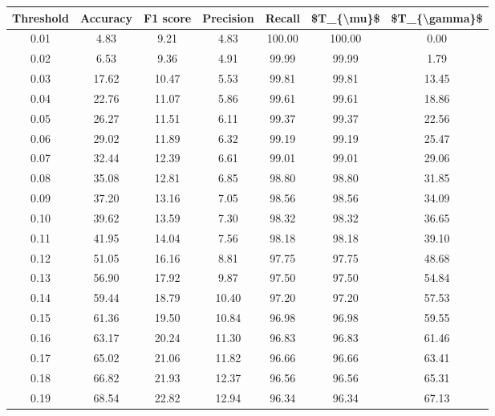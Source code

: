 \begin{tabular}{|c|c|c|c|c|c|c|}
\toprule
 Threshold &  Accuracy &  F1 score &  Precision &  Recall &  \$T\_\{\textbackslash mu\}\$ &  \$T\_\{\textbackslash gamma\}\$ \\
\hline
      0.01 &      4.83 &      9.21 &       4.83 &  100.00 &     100.00 &          0.00 \\
      0.02 &      6.53 &      9.36 &       4.91 &   99.99 &      99.99 &          1.79 \\
      0.03 &     17.62 &     10.47 &       5.53 &   99.81 &      99.81 &         13.45 \\
      0.04 &     22.76 &     11.07 &       5.86 &   99.61 &      99.61 &         18.86 \\
      0.05 &     26.27 &     11.51 &       6.11 &   99.37 &      99.37 &         22.56 \\
      0.06 &     29.02 &     11.89 &       6.32 &   99.19 &      99.19 &         25.47 \\
      0.07 &     32.44 &     12.39 &       6.61 &   99.01 &      99.01 &         29.06 \\
      0.08 &     35.08 &     12.81 &       6.85 &   98.80 &      98.80 &         31.85 \\
      0.09 &     37.20 &     13.16 &       7.05 &   98.56 &      98.56 &         34.09 \\
      0.10 &     39.62 &     13.59 &       7.30 &   98.32 &      98.32 &         36.65 \\
      0.11 &     41.95 &     14.04 &       7.56 &   98.18 &      98.18 &         39.10 \\
      0.12 &     51.05 &     16.16 &       8.81 &   97.75 &      97.75 &         48.68 \\
      0.13 &     56.90 &     17.92 &       9.87 &   97.50 &      97.50 &         54.84 \\
      0.14 &     59.44 &     18.79 &      10.40 &   97.20 &      97.20 &         57.53 \\
      0.15 &     61.36 &     19.50 &      10.84 &   96.98 &      96.98 &         59.55 \\
      0.16 &     63.17 &     20.24 &      11.30 &   96.83 &      96.83 &         61.46 \\
      0.17 &     65.02 &     21.06 &      11.82 &   96.66 &      96.66 &         63.41 \\
      0.18 &     66.82 &     21.93 &      12.37 &   96.56 &      96.56 &         65.31 \\
      0.19 &     68.54 &     22.82 &      12.94 &   96.34 &      96.34 &         67.13 \\

\end{tabular}
